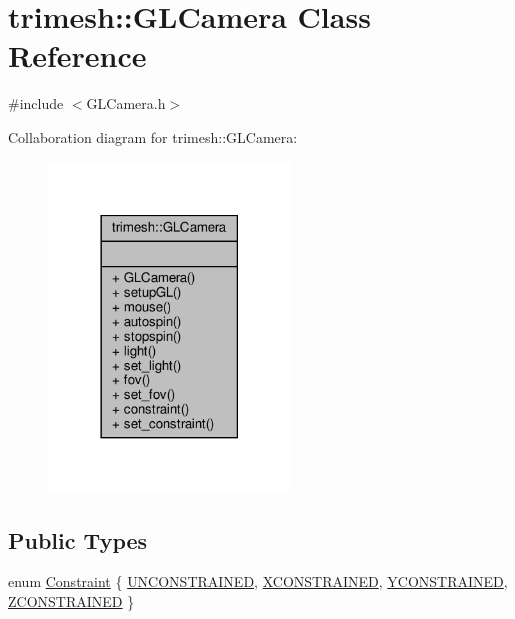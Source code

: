 \hypertarget{classtrimesh_1_1GLCamera}{}\section{trimesh\+:\+:G\+L\+Camera Class Reference}
\label{classtrimesh_1_1GLCamera}


{\ttfamily \#include $<$G\+L\+Camera.\+h$>$}



Collaboration diagram for trimesh\+:\+:G\+L\+Camera\+:\nopagebreak
\begin{figure}[H]
\begin{center}
\leavevmode
\includegraphics[width=182pt]{d5/dc7/classtrimesh_1_1GLCamera__coll__graph}
\end{center}
\end{figure}
\subsection*{Public Types}
\begin{DoxyCompactItemize}
\item 
enum \hyperlink{classtrimesh_1_1GLCamera_a4b7300c68956c148f6f8b014217faed9}{Constraint} \{ \hyperlink{classtrimesh_1_1GLCamera_a4b7300c68956c148f6f8b014217faed9aad6fd65696c348009ecdc5b0847b1145}{U\+N\+C\+O\+N\+S\+T\+R\+A\+I\+N\+ED}, 
\hyperlink{classtrimesh_1_1GLCamera_a4b7300c68956c148f6f8b014217faed9afe1d3daea1dd8899c758d3cdb20a43fd}{X\+C\+O\+N\+S\+T\+R\+A\+I\+N\+ED}, 
\hyperlink{classtrimesh_1_1GLCamera_a4b7300c68956c148f6f8b014217faed9a75b54165fb8fde6c6dddbc2c7c62394c}{Y\+C\+O\+N\+S\+T\+R\+A\+I\+N\+ED}, 
\hyperlink{classtrimesh_1_1GLCamera_a4b7300c68956c148f6f8b014217faed9a1df913d88c41154654d619967db03d4e}{Z\+C\+O\+N\+S\+T\+R\+A\+I\+N\+ED}
 \}
\end{DoxyCompactItemize}
